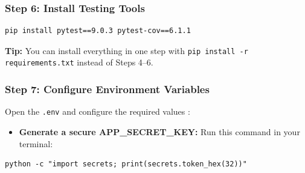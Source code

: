 \documentclass[12pt,a4paper]{article}
\begin{document}
\subsubsection{Step 6: Install Testing Tools}

\begin{tcolorbox}[colback=gray!10!white, colframe=gray!70!black, arc=3pt, boxrule=0.5pt]
\begin{verbatim}
pip install pytest==9.0.3 pytest-cov==6.1.1
\end{verbatim}
\end{tcolorbox}

\begin{tcolorbox}[colback=green!5!white, colframe=green!60!black, arc=3pt, boxrule=0.5pt]
\textbf{Tip:} You can install everything in one step with
\texttt{pip install -r requirements.txt} instead of Steps 4--6.
\end{tcolorbox}

\subsubsection{Step 7: Configure Environment Variables}

\noindent Open the \texttt{.env} and configure the required values :

\begin{itemize}
    \item \textbf{Generate a secure APP\_SECRET\_KEY:} Run this command in your terminal:
\end{itemize}

\begin{tcolorbox}[colback=gray!10!white, colframe=gray!70!black, arc=3pt, boxrule=0.5pt]
\begin{verbatim}
python -c "import secrets; print(secrets.token_hex(32))"
\end{verbatim}
\end{tcolorbox}
\end{document}
